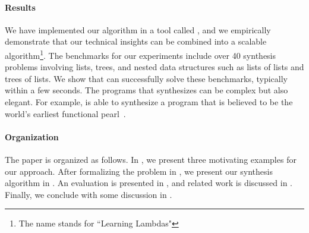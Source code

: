 \paragraph{Results} 

We have implemented our algorithm in a tool called \sys, and we
empirically demonstrate that our technical insights can be combined
into a scalable algorithm\footnote{The name \sys stands for ``Learning
  Lambdas"}. The benchmarks for our experiments include over 40 synthesis
problems involving lists, trees, and nested data structures such as
lists of lists and trees of lists. We show that \sys can successfully
solve these benchmarks, typically within a few seconds. 
The programs that \sys synthesizes can be complex but also elegant.
For example, \sys is able to synthesize a program that is believed to
be the world's earliest functional pearl~\cite{spivey-example}.


%

\paragraph{Organization}

The paper is organized as follows. In , we present three
motivating examples for our approach. After formalizing the problem  in , we
present our synthesis algorithm in  . An evaluation is presented in
, and related work is discussed in . Finally, we
conclude with some discussion in . 
